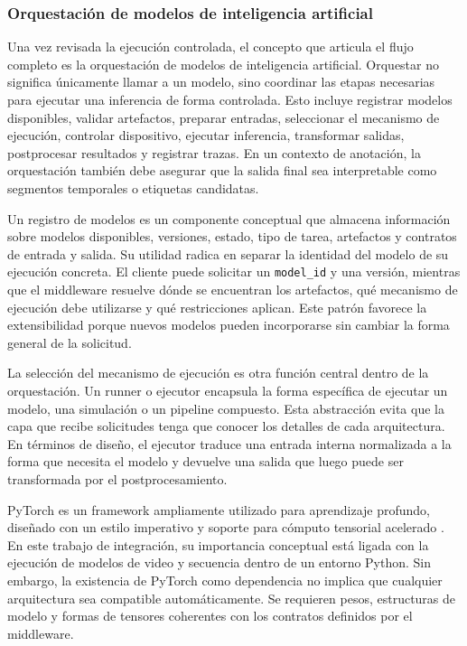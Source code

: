 
\subsubsection{Orquestación de modelos de inteligencia artificial}

Una vez revisada la ejecución controlada, el concepto que articula el flujo completo es la orquestación de modelos de inteligencia artificial. Orquestar no significa únicamente llamar a un modelo, sino coordinar las etapas necesarias para ejecutar una inferencia de forma controlada. Esto incluye registrar modelos disponibles, validar artefactos, preparar entradas, seleccionar el mecanismo de ejecución, controlar dispositivo, ejecutar inferencia, transformar salidas, postprocesar resultados y registrar trazas. En un contexto de anotación, la orquestación también debe asegurar que la salida final sea interpretable como segmentos temporales o etiquetas candidatas.

Un registro de modelos es un componente conceptual que almacena información sobre modelos disponibles, versiones, estado, tipo de tarea, artefactos y contratos de entrada y salida. Su utilidad radica en separar la identidad del modelo de su ejecución concreta. El cliente puede solicitar un \texttt{model\_id} y una versión, mientras que el middleware resuelve dónde se encuentran los artefactos, qué mecanismo de ejecución debe utilizarse y qué restricciones aplican. Este patrón favorece la extensibilidad porque nuevos modelos pueden incorporarse sin cambiar la forma general de la solicitud.

La selección del mecanismo de ejecución es otra función central dentro de la orquestación. Un runner o ejecutor encapsula la forma específica de ejecutar un modelo, una simulación o un pipeline compuesto. Esta abstracción evita que la capa que recibe solicitudes tenga que conocer los detalles de cada arquitectura. En términos de diseño, el ejecutor traduce una entrada interna normalizada a la forma que necesita el modelo y devuelve una salida que luego puede ser transformada por el postprocesamiento.

PyTorch es un framework ampliamente utilizado para aprendizaje profundo, diseñado con un estilo imperativo y soporte para cómputo tensorial acelerado \cite{paszke2019pytorch}. En este trabajo de integración, su importancia conceptual está ligada con la ejecución de modelos de video y secuencia dentro de un entorno Python. Sin embargo, la existencia de PyTorch como dependencia no implica que cualquier arquitectura sea compatible automáticamente. Se requieren pesos, estructuras de modelo y formas de tensores coherentes con los contratos definidos por el middleware.


